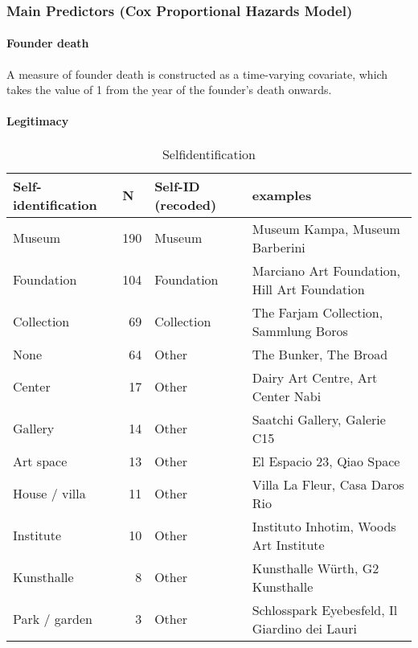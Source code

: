 \documentclass[12pt]{article}
\begin{document}
\subsubsection*{Main Predictors (Cox Proportional Hazards Model)}


\paragraph*{Founder death}

A measure of founder death is constructed as a time-varying covariate, which takes the value of 1 from the year of the founder's death onwards.
\paragraph*{Legitimacy}


\begin{table}[ht]
\centering
\begin{tabular}{lrll}
  \hline 
 \multicolumn{1}{l}{Self-identification} & \multicolumn{1}{l}{N} & \multicolumn{1}{l}{Self-ID (recoded)} & \multicolumn{1}{l}{examples}\\ 
 \hline
 Museum & 190 & Museum & Museum Kampa, Museum Barberini \\ 
  Foundation & 104 & Foundation & Marciano Art Foundation, Hill Art Foundation \\ 
  Collection &  69 & Collection & The Farjam Collection, Sammlung Boros \\ 
  None &  64 & Other & The Bunker, The Broad \\ 
  Center &  17 & Other & Dairy Art Centre, Art Center Nabi \\ 
  Gallery &  14 & Other & Saatchi Gallery, Galerie C15 \\ 
  Art space &  13 & Other & El Espacio 23, Qiao Space \\ 
  House / villa &  11 & Other & Villa La Fleur, Casa Daros Rio \\ 
  Institute &  10 & Other & Instituto Inhotim, Woods Art Institute \\ 
  Kunsthalle &   8 & Other & Kunsthalle Würth, G2 Kunsthalle \\ 
  Park / garden &   3 & Other & Schlosspark Eyebesfeld, Il Giardino dei Lauri \\ 
   \hline
\end{tabular}
\caption{Selfidentification} 
\label{tbl:t_selfid}
\end{table}
\end{document}
